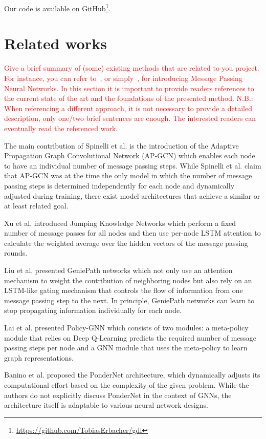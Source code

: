 \documentclass{gdl}
\begin{document}
Our code is available on GitHub\footnote{\url{https://github.com/TobiasErbacher/gdl}}.

\section{Related works}

\textcolor{red}{Give a brief summary of (some) existing methods that are related to you project. For instance, you can refer to~\citet{gilmer2017neural}, or simply~\cite{gilmer2017neural}, for introducing Message Passing Neural Networks. In this section it is important to provide readers references to the current state of the art and the foundations of the presented method. 
N.B.: When referencing a different approach, it is not necessary to provide a detailed description, only one/two brief sentences are enough. The interested readers can eventually read the referenced work. }


The main contribution of Spinelli et al. is the introduction of the Adaptive Propagation Graph Convolutional Network (AP-GCN) which enables each node to have an individual number of message passing steps. While Spinelli et al. claim that AP-GCN was at the time the only model in which the number of message passing steps is determined independently for each node and dynamically adjusted during training, there exist model architectures that achieve a similar or at least related goal.

Xu et al. \cite{xu2018} introduced Jumping Knowledge Networks which perform a fixed number of message passes for all nodes and then use per-node LSTM attention to calculate the weighted average over the hidden vectors of the message passing rounds.   

Liu et al. \cite{liu2019} presented GeniePath networks which not only use an attention mechanism to weight the contribution of neighboring nodes but also rely on an LSTM-like gating mechanism that controls the flow of information from one message passing step to the next. In principle, GeniePath networks can learn to stop propagating information individually for each node.

Lai et al. \cite{lai2020} presented Policy-GNN which consists of two modules: a meta-policy module that relies on Deep Q-Learning predicts the required number of message passing steps per node and a GNN module that uses the meta-policy to learn graph representations.

Banino et al. \cite{banino2021} proposed the PonderNet architecture, which dynamically adjusts its computational effort based on the complexity of the given problem. While the authors do not explicitly discuss PonderNet in the context of GNNs, the architecture itself is adaptable to various neural network designs.
\end{document}
